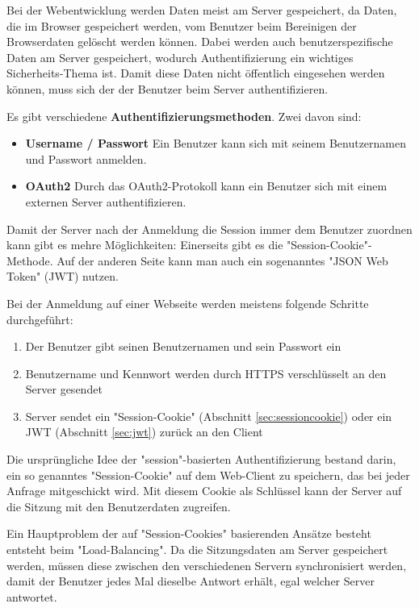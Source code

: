 

Bei der Webentwicklung werden Daten meist am Server gespeichert, da Daten, die im Browser gespeichert werden, vom Benutzer beim Bereinigen der Browserdaten gelöscht werden können. 
Dabei werden auch benutzerspezifische Daten am Server gespeichert, wodurch Authentifizierung ein wichtiges Sicherheits-Thema ist.
Damit diese Daten nicht öffentlich eingesehen werden können, muss sich der der Benutzer beim Server authentifizieren.

Es gibt verschiedene \textbf{Authentifizierungsmethoden}. Zwei davon sind:
\begin{itemize} 
    \item \textbf{Username / Passwort} Ein Benutzer kann sich mit seinem Benutzernamen und Passwort anmelden.
    \item \textbf{OAuth2} Durch das OAuth2-Protokoll kann ein Benutzer sich mit einem externen Server authentifizieren. \cite{OAuth2}
\end{itemize}

Damit der Server nach der Anmeldung die Session immer dem Benutzer zuordnen kann gibt es mehre Möglichkeiten:
Einerseits gibt es die "Session-Cookie"-Methode. Auf der anderen Seite kann man auch ein sogenanntes "JSON Web Token" (JWT) nutzen.

Bei der Anmeldung auf einer Webseite werden meistens folgende Schritte durchgeführt:
\begin{enumerate}
    \item Der Benutzer gibt seinen Benutzernamen und sein Passwort ein
    \item Benutzername und Kennwort werden durch HTTPS verschlüsselt an den Server gesendet
    \item Server sendet ein "Session-Cookie" (Abschnitt \ref{sec:sessioncookie}) oder ein JWT (Abschnitt \ref{sec:jwt}) zurück an den Client
\end{enumerate}

\pagebreak
{}\label{sec:sessioncookie}

Die ursprüngliche Idee der "session"-basierten Authentifizierung bestand darin, ein so genanntes "Session-Cookie" auf dem Web-Client zu speichern, das bei jeder Anfrage mitgeschickt wird. Mit diesem Cookie als Schlüssel kann der Server auf die Sitzung mit den Benutzerdaten zugreifen. 

Ein Hauptproblem der auf "Session-Cookies" basierenden Ansätze besteht entsteht beim "Load-Balancing". 
Da die Sitzungsdaten am Server gespeichert werden, müssen diese zwischen den verschiedenen Servern synchronisiert werden, damit der Benutzer jedes Mal dieselbe Antwort erhält, egal welcher Server antwortet. 

